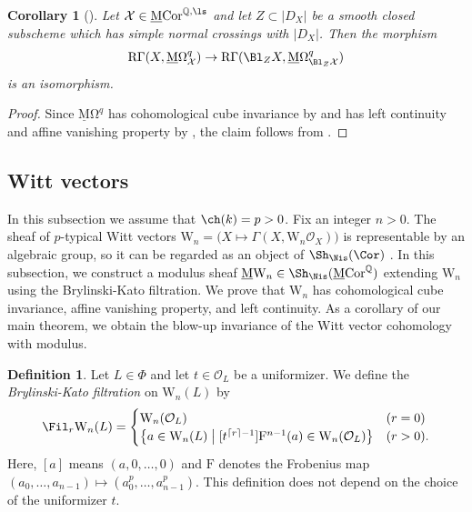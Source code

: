 \documentclass{amsart}
\theoremstyle{plain}
\newtheorem{corollary}[theorem]{Corollary}
\theoremstyle{definition}
\newtheorem{definition}[theorem]{Definition}
\theoremstyle{remark}
\numberwithin{equation}{section}
\def\ceil#1{\lceil #1 \rceil}
\def\RGamma{\mathrm{R}\Gamma}
\def\MCor{\mathrm{\underline{M}Cor}}
\def\MOmega{\mathrm{\underline{M}\Omega}}
\def\MW{\underline{\mathrm{M}}\mathrm{W}}
\begin{document}
\begin{corollary}[{\cite[Theorem 6.1]{KellyMiyazaki_Hodge2}}]\label{Omega_CBI}
    Let $\mathcal{X}\in \MCor^{\mathbb{Q},\ls}$ and let $Z\subset |D_X|$ be a smooth closed subscheme which has simple normal crossings with $|D_X|$.
    Then the morphism
    $$
        \RGamma(X,\MOmega^q_\mathcal{X})\to \RGamma(\Bl_ZX,\MOmega^q_{\Bl_Z\mathcal{X}})
    $$
    is an isomorphism.
\end{corollary}

\begin{proof}
    Since $\MOmega^q$ has cohomological cube invariance by  and has left continuity and affine vanishing property by , the claim follows from .
\end{proof}


\subsection{Witt vectors}
In this subsection we assume that $\ch(k)=p>0$.
Fix an integer $n>0$.
The sheaf of $p$-typical Witt vectors $\mathrm{W}_n=\bigl(X\mapsto \Gamma(X,\mathrm{W}_n\mathcal{O}_X)\bigr)$ is representable by an algebraic group, so it can be regarded as an object of $\Sh_\Nis(\Cor)$ \cite[Lemma 1.4.4]{BVK16}.
In this subsection, we construct a modulus sheaf $\MW_n\in \Sh_\Nis(\MCor^{\mathbb{Q}})$ extending $\mathrm{W}_n$ using the Brylinski-Kato filtration.
We prove that $\mathrm{W}_n$ has cohomological cube invariance, affine vanishing property, and left continuity.
As a corollary of our main theorem, we obtain the blow-up invariance of the Witt vector cohomology with modulus.


\begin{definition}
	Let $L\in \Phi$ and let $t\in \mathcal{O}_L$ be a uniformizer.
	We define the \emph{Brylinski-Kato filtration} \cite[Definition 3.1]{Kato89} on $\mathrm{W}_n(L)$ by
	$$
		\Fil_r \mathrm{W}_n(L)=\begin{cases}
			\mathrm{W}_n(\mathcal{O}_L)&(r=0)\\
			\bigl\{a\in \mathrm{W}_n(L)\bigm| [t^{\ceil{r}-1}]\mathrm{F}^{n-1}(a)\in \mathrm{W}_n(\mathcal{O}_L)\bigr\}&(r>0).
		\end{cases}
	$$
        Here, $[a]$ means $(a,0,\dots,0)$ and $\mathrm{F}$ denotes the Frobenius map $(a_0,\dots,a_{n-1})\mapsto (a_0^p,\dots,a_{n-1}^p)$.
	This definition does not depend on the choice of the uniformizer $t$.
\end{definition}
\end{document}

